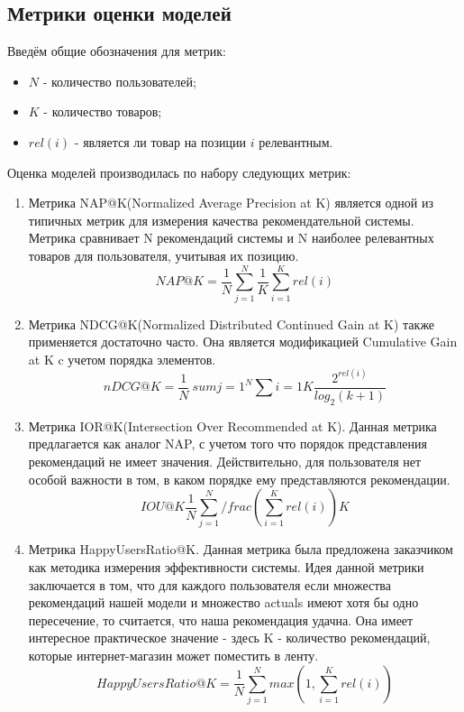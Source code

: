\documentclass[14pt]{mmcs_article}
\begin{document}
\subsection{Метрики оценки моделей}
Введём общие обозначения для метрик:
\begin{itemize}
	\item $N$ - количество пользователей;
	\item $K$ - количество товаров;
	\item $rel(i)$ - является ли товар на позиции $i$ релевантным.
\end{itemize}


Оценка моделей производилась по набору следующих метрик:
\begin{enumerate}
	\item Метрика NAP@K(Normalized Average Precision at K) является одной из типичных метрик для измерения качества рекомендательной системы. Метрика сравнивает N рекомендаций системы и N наиболее релевантных товаров для пользователя, учитывая их позицию. 
	\begin{equation}
		NAP@K = \frac{1}{N} \sum_{j=1}^{N} \frac{1}{K}\sum_{i=1}^{K}rel(i)
	\end{equation}
	\item Метрика NDCG@K(Normalized Distributed Continued Gain at K) также применяется достаточно часто. Она является модификацией Cumulative Gain at K c учетом порядка элементов.
	\begin{equation}
		nDCG@K= \frac{1}{N} \ sum{j=1}^N \sum{i=1}{K} \frac{2^{rel(i)} }{log_2(k+1)} 	
    \end{equation}   
	\item Метрика IOR@K(Intersection Over Recommended at K). Данная метрика предлагается как аналог NAP, с учетом того что порядок представления рекомендаций не имеет значения. Действительно, для пользователя нет особой важности в том, в каком порядке ему представляются рекомендации.
	\begin{equation}
		IOU@K \frac{1}{N} \sum_{j=1}^N  /frac{(\sum_{i=1}^{K} rel(i))}{K} 
	\end{equation} 
	\item Метрика HappyUsersRatio@K. Данная метрика была предложена заказчиком как методика измерения эффективности системы. Идея данной метрики заключается в том, что для каждого пользователя если множества рекомендаций нашей модели и множество actuals имеют хотя бы одно пересечение, то считается, что наша рекомендация удачна. Она имеет интересное практическое значение - здесь K - количество рекомендаций, которые интернет-магазин может поместить в ленту.
	\begin{equation}
	   HappyUsersRatio@K = \frac{1}{N}\sum_{j=1}^{N} max(1,\sum_{i=1}^{K} rel(i)) 		
	\end{equation}
\end{enumerate}
\end{document}
